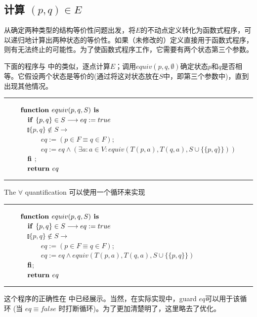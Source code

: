 \subsection{计算 $ (p,q) \in E $}

从确定两种类型的结构等价性问题出发，将$E$的不动点定义转化为函数式程序，可以递归地计算出两种状态的等价性。如果（未修改的）定义直接用于函数式程序，则有无法终止的可能性。为了使函数式程序工作，它需要有两个状态第三个参数。

下面的程序与 \cite{t-Ei91} 中的类似，逐点计算$E$；调用$equiv(p,q,\emptyset)$确定状态$p$和$q$是否相等。它假设两个状态是等价的(通过将这对状态放在$S$中，即第三个参数中)，直到出现其他情况。
\newline
\rule{\textwidth}{1pt}
\mbox{　　} $\mbox{\textbf{function }} equiv (p,q,S) \mbox{\textbf{ is }}$ \\
\mbox{　　　} $ \mbox{\textbf{if }} \{ p,q \} \in S \longrightarrow eq := true $ \\
\mbox{　　　} $ \talloblong \{ p,q \} \not\in S \longrightarrow $ \\
\mbox{　　　　　} $ eq := ( p \in F \equiv q \in F ) $; \\
\mbox{　　　　　} $ eq := eq \land (\exists a:a \in V : equiv (T(p,a),T(q,a),S \cup \{ \{ p,q\} \}  ) )  $ \\
\mbox{　　　} $\mbox{\textbf{fi}}$ ;\\
\mbox{　　　} $\mbox{\textbf{return }} eq$ \\
\rule{\textwidth}{1pt}
The $\forall$ quantification 可以使用一个循环来实现
\newline
\rule{\textwidth}{1pt}
\mbox{　　} $\mbox{\textbf{function }} equiv (p,q,S) \mbox{\textbf{ is }}$ \\
\mbox{　　　} $ \mbox{\textbf{if }} \{ p,q \} \in S \longrightarrow eq := true $ \\
\mbox{　　　} $ \talloblong \{ p,q \} \not\in S \longrightarrow $ \\
\mbox{　　　　　} $ eq := ( p \in F \equiv q \in F ) $; \\
\mbox{　　　　　} $ eq := eq \land equiv (T(p,a),T(q,a),S \cup \{ \{ p,q\} \}  )   $ \\
\mbox{　　　} $\mbox{\textbf{fi}}$; \\
\mbox{　　　} $\mbox{\textbf{return }} eq$ \\
\rule{\textwidth}{1pt}
这个程序的正确性在 \cite{t-Ei91} 中已经展示。当然，在实际实现中，guard $eq$可以用于该循环 (当 $eq \equiv false$ 时打断循环)。为了更加清楚明了，这里略去了优化。

